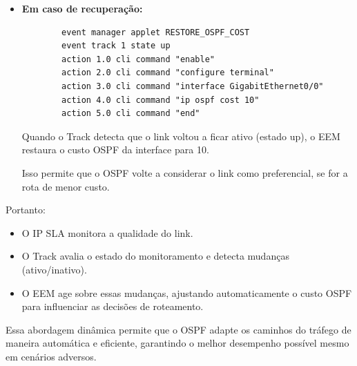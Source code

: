 \documentclass[11pt,english, openright, oneside]{book}
\begin{document}
\begin{enumerate}
\begin{itemize}
      \item \textbf{Em caso de recuperação:}
      \begin{verbatim}
        event manager applet RESTORE_OSPF_COST
        event track 1 state up
        action 1.0 cli command "enable"
        action 2.0 cli command "configure terminal"
        action 3.0 cli command "interface GigabitEthernet0/0"
        action 4.0 cli command "ip ospf cost 10"
        action 5.0 cli command "end"
      \end{verbatim}

      Quando o Track detecta que o link voltou a ficar ativo (estado up), o EEM restaura o custo OSPF da interface para 10. \par
      Isso permite que o OSPF volte a considerar o link como preferencial, se for a rota de menor custo.
  \end{itemize}
\end{enumerate}

\pagebreak
Portanto:
\begin{itemize}
  \item O IP SLA monitora a qualidade do link.
  \item O Track avalia o estado do monitoramento e detecta mudanças (ativo/inativo).
  \item O EEM age sobre essas mudanças, ajustando automaticamente o custo OSPF para influenciar as decisões de roteamento.
\end{itemize}

Essa abordagem dinâmica permite que o OSPF adapte os caminhos do tráfego de maneira automática e eficiente, garantindo o melhor desempenho possível mesmo em cenários adversos.

\vspace{0.8cm}
\end{document}
